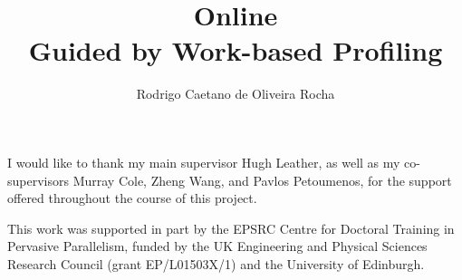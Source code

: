 \documentclass[mscres,icsa,logo,twoside]{infthesis}
\title{Online {\IterComp}\\Guided by Work-based Profiling}
\author{Rodrigo Caetano de Oliveira Rocha}
\theoremstyle{definition}
\begin{document}
\begin{preliminary}

\maketitle

\begin{acknowledgements}
%
I would like to thank my main supervisor Hugh Leather, as well as my co-supervisors Murray Cole, Zheng Wang, and Pavlos Petoumenos,
for the support offered throughout the course of this project.

This work was supported in part by the EPSRC Centre for Doctoral Training in Pervasive Parallelism, funded by the UK Engineering and Physical Sciences Research Council (grant EP/L01503X/1) and the University of Edinburgh.
\end{acknowledgements}

\standarddeclaration

\dedication{To my parents and Isabella.}

\tableofcontents

\listoffigures
\listoftables

\end{preliminary}





%





%






\end{document}
